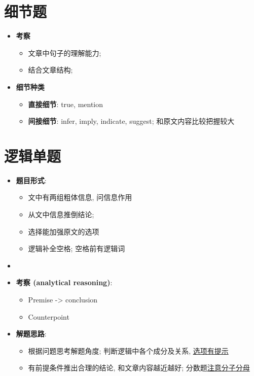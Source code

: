 \section{细节题}

  \begin{itemize}
    \item \textbf{考察}
    \begin{itemize}
      \item 文章中句子的理解能力;
      \item 结合文章结构;
    \end{itemize}

    \item \textbf{细节种类}
    \begin{itemize}
      \item \textbf{直接细节}: true, mention
      \item \textbf{间接细节}: infer, imply, indicate, suggest;
      和原文内容比较把握较大
    \end{itemize}
  \end{itemize}

\section{逻辑单题}

  \begin{itemize}
    \item \textbf{题目形式}:
    \begin{itemize}
      \item 文中有两组粗体信息, 问信息作用
      \item 从文中信息推倒结论;
      \item 选择能加强原文的选项
      \item 逻辑补全空格; 空格前有逻辑词
    \end{itemize}

    \item {}
    \item \textbf{考察 (analytical reasoning)}:
    \begin{itemize}
      \item Premise -> conclusion
      \item Counterpoint
    \end{itemize}

    \item \textbf{解题思路}:
    \begin{itemize}
      \item 根据问题思考解题角度; 判断逻辑中各个成分及关系, \uline{选项有提示}
      \item 有前提条件推出合理的结论, 和文章内容越近越好; 分数题\uline{注意分子分母}
    \end{itemize}
  \end{itemize}

